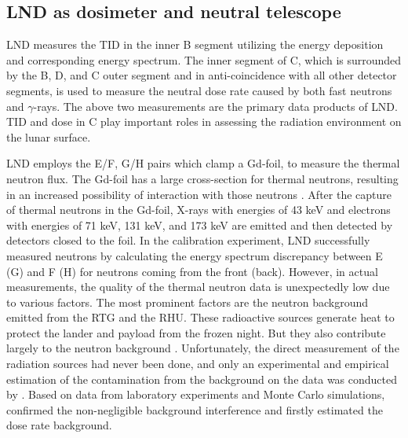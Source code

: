 \subsection*{LND as dosimeter and neutral telescope}

\ac{LND} measures the \ac{TID} in the inner B segment utilizing the energy deposition and corresponding energy spectrum. The inner segment of C, which is surrounded by the B, D, and C outer segment and in anti-coincidence with all other detector segments, is used to measure the neutral dose rate caused by both fast neutrons and $\gamma$-rays. The above two measurements are the primary data products of \ac{LND}. \ac{TID} and dose in C play important roles in assessing the radiation environment on the lunar surface. 


\ac{LND} employs the E/F, G/H pairs which clamp a Gd-foil, to measure the thermal neutron flux. The Gd-foil has a large cross-section for thermal neutrons, resulting in an increased possibility of interaction with those neutrons \citep{Wimmer2020SSRv}. After the capture of thermal neutrons in the Gd-foil, X-rays with energies of 43 keV and electrons with energies of 71 keV, 131 keV, and 173 keV are emitted and then detected by detectors closed to the foil.
In the calibration experiment, \ac{LND} successfully measured neutrons by calculating the energy spectrum discrepancy between E (G) and F (H) for neutrons coming from the front (back).
However, in actual measurements, the quality of the thermal neutron data is unexpectedly low due to various factors. The most prominent factors are the neutron background emitted from the \ac{RTG} and the \ac{RHU}. These radioactive sources generate heat to protect the lander and payload from the frozen night. But they also contribute largely to the neutron background \citep{Zhang2020SciAdv}. Unfortunately, the direct measurement of the radiation sources had never been done, and only an experimental and empirical estimation of the contamination from the background on the data was conducted by \citet{Hou2020-LNDbackground}. Based on data from laboratory experiments and Monte Carlo simulations, \citet{Hou2020-LNDbackground} confirmed the non-negligible background interference and firstly estimated the dose rate background. 

